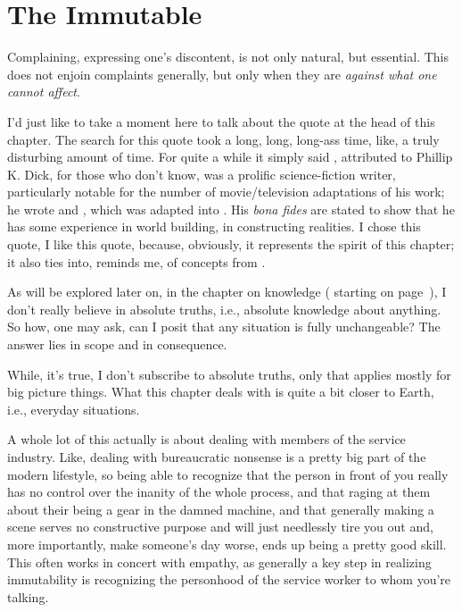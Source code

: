 \documentclass[../butidigress.tex]{subfiles}
\begin{document}
\chapter{The Immutable}\label{chap:immutable}
\newpage
{}
Complaining, expressing one's discontent, is not only natural, but essential.
This does not enjoin complaints generally, but only when they are \emph{against what one cannot affect}.

I'd just like to take a moment here to talk about the quote at the head of this chapter.
The search for this quote took a long, long, long-ass time, like, a truly disturbing amount of time.
For quite a while it simply said , attributed to 
Phillip K. Dick, for those who don't know, was a prolific science-fiction writer, particularly notable for the number of movie/television adaptations of his work; he wrote  and , which was adapted into .
His \textit{bona fides} are stated to show that he has some experience in world building, in constructing realities.
I chose this quote, I like this quote, because, obviously, it represents the spirit of this chapter; it also ties into, reminds me, of concepts from .

As will be explored later on, in the chapter on knowledge ( starting on page~\pageref{chap:knowledge}), I don't really believe in absolute truths, i.e., absolute knowledge about anything.
So how, one may ask, can I posit that any situation is fully unchangeable?
The answer lies in scope and in consequence.

While, it's true, I don't subscribe to absolute truths, only  that applies mostly for big picture things.
What this chapter deals with is quite a bit closer to Earth, i.e., everyday situations.

A whole lot of this actually is about dealing with members of the service industry.
Like, dealing with bureaucratic nonsense is a pretty big part of the modern lifestyle, so being able to recognize that the person in front of you really has no control over the inanity of the whole process, and that raging at them about their being a gear in the damned machine, and that generally making a scene serves no constructive purpose and will just needlessly tire you out and, more importantly, make someone's day worse, ends up being a pretty good skill.
This often works in concert with empathy, as generally a key step in realizing immutability is recognizing the personhood of the service worker to whom you're talking.
\end{document}
